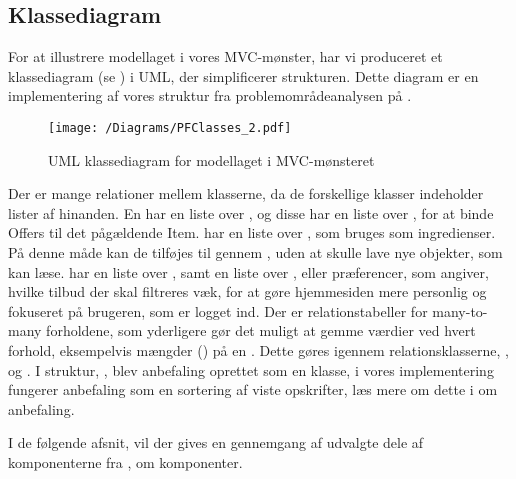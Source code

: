 \subsection{Klassediagram}
For at illustrere modellaget i vores MVC-mønster, har vi produceret et klassediagram (se ) i UML, der simplificerer strukturen. 
Dette diagram er en implementering af vores struktur fra problemområdeanalysen på .

\begin{figure}[h!]
\centering
 \texttt{[image: /Diagrams/PFClasses\_2.pdf]} %
\caption{UML klassediagram for modellaget i MVC-mønsteret}\label{diagram:klassediagram}
\end{figure}

Der er mange relationer mellem klasserne, da de forskellige klasser indeholder lister af hinanden.
En  har en liste over , og disse  har en liste over , for at binde Offers til det pågældende Item.
 har en liste over , som bruges som ingredienser.
På denne måde kan de tilføjes til  gennem , uden at skulle lave nye objekter, som  kan læse.
 har en liste over , samt en liste over , eller præferencer, som angiver, hvilke tilbud der skal filtreres væk, for at gøre hjemmesiden mere personlig og fokuseret på brugeren, som er logget ind.
Der er relationstabeller for many-to-many forholdene, som yderligere gør det muligt at gemme værdier ved hvert forhold, eksempelvis mængder () på en .
Dette gøres igennem relationsklasserne, , og .
I struktur, , blev anbefaling oprettet som en klasse, i vores implementering fungerer anbefaling som en sortering af viste opskrifter, læs mere om dette i  om anbefaling.

I de følgende afsnit, vil der gives en gennemgang af udvalgte dele af komponenterne fra , om komponenter.

